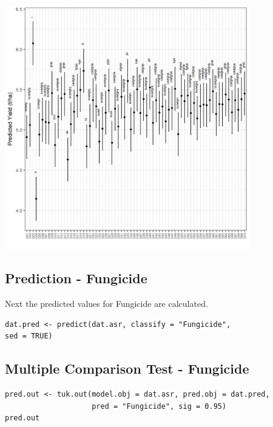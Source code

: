 \documentclass[a4paper, 10pt, fleqn, twosided]{memoir}
\begin{document}
\begin{tcolorbox}[title = Example 5 Graph of predicted Genotype values]
\includegraphics[width=0.8\textwidth, frame]{Example5GenoPred.png}
\end{tcolorbox}


\subsection{Prediction - Fungicide}

Next the predicted values for Fungicide are calculated.

\begin{tcolorbox}[title = Example 5 predicted values]
\begin{verbatim}
dat.pred <- predict(dat.asr, classify = "Fungicide",
sed = TRUE)
\end{verbatim}
\end{tcolorbox}

\subsection{Multiple Comparison Test - Fungicide}

\begin{tcolorbox}[title = Example 5 Tukey's multiple comparison]
\begin{verbatim}
pred.out <- tuk.out(model.obj = dat.asr, pred.obj = dat.pred,
                    pred = "Fungicide", sig = 0.95)
pred.out
\end{verbatim}
\end{tcolorbox}
\clearpage
\end{document}

